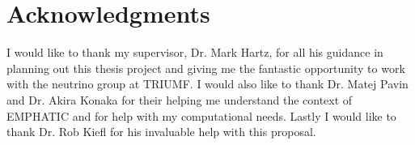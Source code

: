 
\chapter{Acknowledgments}

I would like to thank my supervisor, Dr. Mark Hartz, for all his guidance in planning out this thesis project and giving me the fantastic opportunity to work with the neutrino group at TRIUMF.
I would also like to thank Dr. Matej Pavin and Dr. Akira Konaka for their helping me understand the context of \ac{EMPHATIC} and for help with my computational needs.
Lastly I would like to thank Dr. Rob Kiefl for his invaluable help with this proposal.